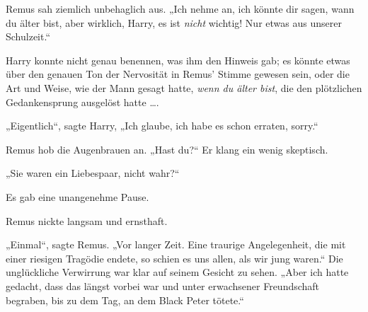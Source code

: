 Remus sah ziemlich unbehaglich aus.
„Ich nehme an, ich könnte dir sagen, wann du älter bist, aber wirklich, Harry, es ist \emph{nicht} wichtig! Nur etwas aus unserer Schulzeit.“

Harry konnte nicht genau benennen, was ihm den Hinweis gab; es könnte etwas über den genauen Ton der Nervosität in Remus’ Stimme gewesen sein, oder die Art und Weise, wie der Mann gesagt hatte, \emph{wenn du älter bist}, die den plötzlichen Gedankensprung ausgelöst hatte ….

„Eigentlich“, sagte Harry,
„Ich glaube, ich habe es schon erraten, sorry.“

Remus hob die Augenbrauen an.
„Hast du?“ Er klang ein wenig skeptisch.

„Sie waren ein Liebespaar, nicht wahr?“

Es gab eine unangenehme Pause.

Remus nickte langsam und ernsthaft.

„Einmal“, sagte Remus.
„Vor langer Zeit. Eine traurige Angelegenheit, die mit einer riesigen Tragödie endete, so schien es uns allen, als wir jung waren.“ Die unglückliche Verwirrung war klar auf seinem Gesicht zu sehen.
„Aber ich hatte gedacht, dass das längst vorbei war und unter erwachsener Freundschaft begraben, bis zu dem Tag, an dem Black Peter tötete.“

